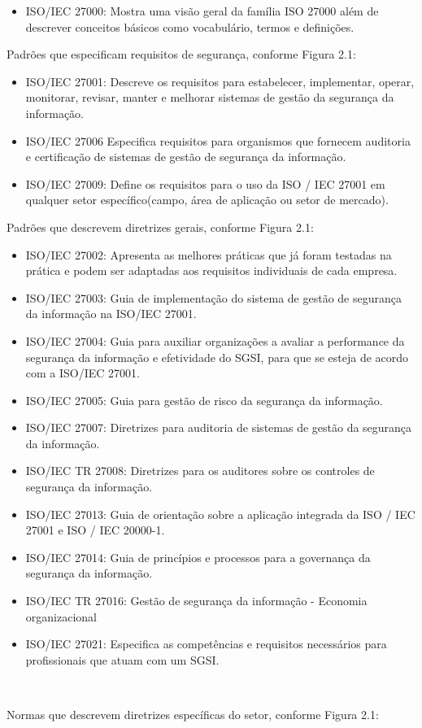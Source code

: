 \begin{itemize}
    \item ISO/IEC 27000: Mostra uma visão geral da família ISO 27000 além de descrever conceitos básicos como vocabulário, termos e definições.
    \end{itemize}
    
    \item{Padrões que especificam requisitos de segurança, conforme Figura 2.1:}
    
    \begin{itemize}
    \item ISO/IEC 27001: Descreve os requisitos para estabelecer, implementar, operar, monitorar, revisar, manter e melhorar  sistemas de gestão da segurança da informação. 
    \item ISO/IEC 27006 Especifica requisitos para organismos que fornecem auditoria e certificação de sistemas de gestão de segurança da informação. 
    \item ISO/IEC 27009: Define os requisitos para o uso da ISO / IEC 27001 em qualquer setor específico(campo, área de aplicação ou setor de mercado).
    \end{itemize}
    
    \item{Padrões que descrevem diretrizes gerais, conforme Figura 2.1:}
    
    \begin{itemize}
    \item ISO/IEC 27002: Apresenta as melhores práticas que já foram testadas na prática e podem ser adaptadas aos requisitos individuais de cada empresa.
    \item ISO/IEC 27003: Guia de implementação do sistema de gestão de segurança da informação na ISO/IEC 27001.
    \item ISO/IEC 27004: Guia para auxiliar organizações a avaliar a performance da segurança da informação e efetividade do SGSI, para que se esteja de acordo com a  ISO/IEC 27001.
    \item ISO/IEC 27005: Guia para gestão de risco da segurança da informação.
    \item ISO/IEC 27007: Diretrizes para auditoria de sistemas de gestão da segurança da informação.
    \item ISO/IEC TR 27008: Diretrizes para os auditores sobre os controles de segurança da informação. 
    \item ISO/IEC 27013: Guia de orientação sobre a aplicação integrada da ISO / IEC 27001 e ISO / IEC 20000-1. 
    \item ISO/IEC 27014: Guia de princípios e processos para a governança da segurança da informação.
    \item ISO/IEC TR 27016: Gestão de segurança da informação - Economia organizacional
    \item ISO/IEC  27021: Especifica as competências e requisitos necessários para profissionais que atuam com um SGSI.
    \end{itemize}
   \
 \item{Normas que descrevem diretrizes específicas do setor, conforme Figura 2.1:}
 
